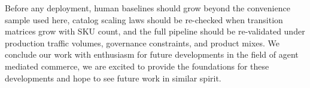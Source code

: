 Before any deployment, human baselines should grow beyond the convenience sample used here, catalog scaling laws should be re-checked when transition matrices grow with SKU count, and the full pipeline should be re-validated under production traffic volumes, governance constraints, and product mixes.
We conclude our work with enthusiasm for future developments in the field of agent mediated commerce, we are excited to provide the foundations for these developments and hope to see future work in similar spirit.
